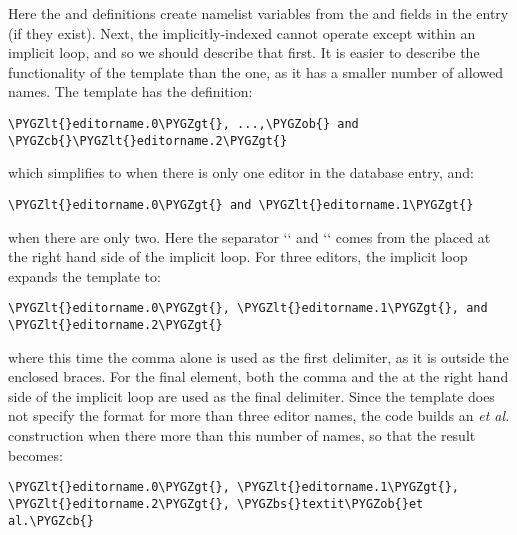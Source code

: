 \documentclass[letterpaper,10pt,english]{sphinxmanual}
\def\PYGZbs{\char`\\}
\def\PYGZob{\char`\{}
\def\PYGZcb{\char`\}}
\def\PYGZlt{\char`\<}
\def\PYGZgt{\char`\>}
\begin{document}
Here the  and  definitions create namelist variables from the  and  fields in the entry (if they exist). Next, the implicitly-indexed  cannot operate except within an implicit loop, and so we should describe that first. It is easier to describe the functionality of the  template than the  one, as it has a smaller number of allowed names. The  template has the definition:

\begin{Verbatim}[commandchars=\\\{\}]
\PYGZlt{}editorname.0\PYGZgt{}, ...,\PYGZob{} and \PYGZcb{}\PYGZlt{}editorname.2\PYGZgt{}
\end{Verbatim}

which simplifies to  when there is only one editor in the database entry, and:

\begin{Verbatim}[commandchars=\\\{\}]
\PYGZlt{}editorname.0\PYGZgt{} and \PYGZlt{}editorname.1\PYGZgt{}
\end{Verbatim}

when there are only two. Here the separator {}`{}` and {}`{}` comes from the  placed at the right hand side of the implicit loop. For three editors, the implicit loop expands the template to:

\begin{Verbatim}[commandchars=\\\{\}]
\PYGZlt{}editorname.0\PYGZgt{}, \PYGZlt{}editorname.1\PYGZgt{}, and \PYGZlt{}editorname.2\PYGZgt{}
\end{Verbatim}

where this time the comma alone is used as the first delimiter, as it is outside the enclosed braces. For the final element, both the comma and the  at the right hand side of the implicit loop are used as the final delimiter. Since the template does not specify the format for more than three editor names, the code builds an \emph{et al.} construction when there more than this number of names, so that the result becomes:

\begin{Verbatim}[commandchars=\\\{\}]
\PYGZlt{}editorname.0\PYGZgt{}, \PYGZlt{}editorname.1\PYGZgt{}, \PYGZlt{}editorname.2\PYGZgt{}, \PYGZbs{}textit\PYGZob{}et al.\PYGZcb{}
\end{Verbatim}
\end{document}
